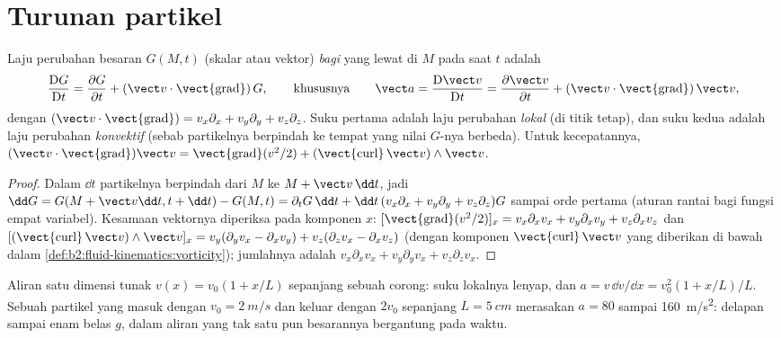 \section{Turunan partikel}

\begin{theorem}\label{thm:b2:fluid-kinematics:material}
Laju perubahan besaran $G(M, t)$ (skalar atau vektor) \emph{bagi
} yang lewat di $M$ pada saat $t$ adalah
\[
\frac{\mathrm DG}{\mathrm Dt} = \frac{\partial G}{\partial t} + (\vect v\cdot
\operatorname{\vect{grad}})\,G ,
\qquad\text{khususnya}\qquad
\vect a = \frac{\mathrm D\vect v}{\mathrm Dt} = \frac{\partial\vect v}{\partial t} +
(\vect v\cdot\operatorname{\vect{grad}})\,\vect v ,
\]
dengan $(\vect v\cdot\operatorname{\vect{grad}}) = v_x\partial_x + v_y\partial_y +
v_z\partial_z$. Suku pertama adalah laju perubahan \emph{lokal} (di titik
tetap), dan suku kedua adalah laju perubahan \emph{konvektif} (sebab
partikelnya berpindah ke tempat yang nilai $G$-nya berbeda). Untuk
kecepatannya,
$(\vect v\cdot
\operatorname{\vect{grad}})\vect v = \operatorname{\vect{grad}}(v^2/2) +
(\operatorname{\vect{curl}}\vect v)\wedge\vect v$.
\end{theorem}

\begin{proof}
Dalam $\dd t$ partikelnya berpindah dari $M$ ke $M + \vect v\,\dd t$, jadi $\dd G =
G(M + \vect v\dd t, t + \dd t) - G(M, t) = \partial_tG\,\dd t + \dd t\,(v_x\partial_x
+ v_y\partial_y + v_z\partial_z)G$ sampai orde pertama (aturan rantai bagi fungsi
empat variabel). Kesamaan vektornya diperiksa pada komponen $x$:
$[\operatorname{\vect{grad}}(v^2/2)]_x = v_x\partial_xv_x + v_y\partial_x
v_y + v_z\partial_xv_z$ dan $[(\operatorname{\vect{curl}}\vect v)\wedge\vect v]_x =
v_y(\partial_yv_x - \partial_xv_y) + v_z(\partial_zv_x - \partial_xv_z)$ (dengan
komponen $\operatorname{\vect{curl}}\vect v$ yang diberikan di bawah dalam
\cref{def:b2:fluid-kinematics:vorticity}); jumlahnya adalah $v_x\partial_xv_x +
v_y\partial_yv_x + v_z\partial_zv_x$.
\end{proof}

\begin{example}\label{ex:b2:fluid-kinematics:nozzle}
Aliran satu dimensi tunak $v(x) = v_0(1 + x/L)$ sepanjang sebuah corong:
suku lokalnya lenyap, dan $a = v\,\dd v/\dd x = v_0^2(1 + x/L)/L$. Sebuah
partikel yang masuk dengan $v_0 = \qty{2}{m/s}$ dan keluar dengan $2v_0$ sepanjang $L
= \qty{5}{cm}$ merasakan $a = 80$ sampai \qty{160}{m/s^2}: delapan sampai enam belas $g$,
dalam aliran yang tak satu pun besarannya bergantung pada waktu.
\end{example}

